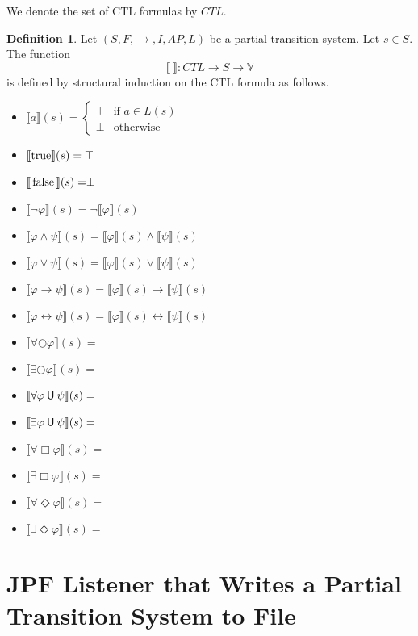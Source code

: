 \documentclass[12pt]{article}
\newcommand{\always}{\Box}
\newcommand{\eventually}{\Diamond}
\newcommand{\nxt}{\bigcirc}
\newcommand{\until}{\mathbin{\sf U}}
\newcommand{\TRUE}{\mbox{\lstinline{true}}}
\newcommand{\FALSE}{\mbox{\lstinline{false}}}
\theoremstyle{definition}
\newtheorem{definition}{Definition}
\newcommand{\satisfaction}[1]{\llbracket #1 \rrbracket}
\begin{document}
We denote the set of CTL formulas by $\mathit{CTL}$.

\begin{definition}
Let $(S, F, \rightarrow, I, \mathit{AP}, L)$ be a partial transition system.  Let $s \in S$.  The function 
\[
\satisfaction{\ } : \mathit{CTL} \to S \to \mathbb{V}
\] 
is defined by structural induction on the CTL formula as follows.
\begin{itemize}
\item
$\satisfaction{a}(s) = 
\left \{
\begin{array}{ll}
\top & \mbox{if $a \in L(s)$}\\
\perp & \mbox{otherwise}
\end{array}
\right.$
\item 
$\satisfaction{\TRUE}(s) = \top$
\item 
$\satisfaction{\FALSE}(s) = \perp$
\item
$\satisfaction{\neg \varphi}(s) = \neg \satisfaction{\varphi}(s)$
\item
$\satisfaction{\varphi \wedge \psi}(s) = \satisfaction{\varphi}(s) \wedge  \satisfaction{\psi}(s)$
\item
$\satisfaction{\varphi \vee \psi}(s) = \satisfaction{\varphi}(s) \vee  \satisfaction{\psi}(s)$
\item
$\satisfaction{\varphi \rightarrow \psi}(s) = \satisfaction{\varphi}(s) \rightarrow  \satisfaction{\psi}(s)$
\item
$\satisfaction{\varphi \leftrightarrow \psi}(s) = \satisfaction{\varphi}(s) \leftrightarrow  \satisfaction{\psi}(s)$
\item
$\satisfaction{\forall \nxt \varphi}(s) = $
\item
$\satisfaction{\exists \nxt \varphi}(s) = $
\item
$\satisfaction{\forall \varphi \until \psi}(s) = $
\item
$\satisfaction{\exists \varphi \until \psi}(s) = $
\item
$\satisfaction{\forall \always \varphi}(s) = $
\item
$\satisfaction{\exists \always \varphi}(s) = $
\item
$\satisfaction{\forall \eventually \varphi}(s) = $
\item
$\satisfaction{\exists \eventually \varphi}(s) = $
\end{itemize}
\end{definition}

\section{JPF Listener that Writes a Partial Transition System to File}
\end{document}
